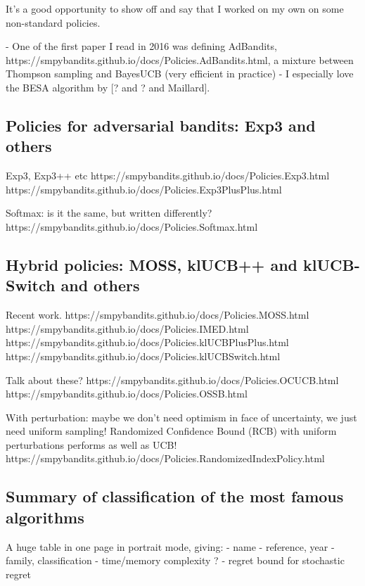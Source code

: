 It's a good opportunity to show off and say that I worked on my own on some non-standard policies.

- One of the first paper I read in 2016 was defining AdBandits, https://smpybandits.github.io/docs/Policies.AdBandits.html, a mixture between Thompson sampling and BayesUCB (very efficient in practice)
- I especially love the BESA algorithm by [? and ? and Maillard].


\subsection{Policies for adversarial bandits: Exp3 and others}

Exp3, Exp3++ etc
https://smpybandits.github.io/docs/Policies.Exp3.html
https://smpybandits.github.io/docs/Policies.Exp3PlusPlus.html

Softmax: is it the same, but written differently?
https://smpybandits.github.io/docs/Policies.Softmax.html


\subsection{Hybrid policies: MOSS, klUCB++ and klUCB-Switch and others}

Recent work.
https://smpybandits.github.io/docs/Policies.MOSS.html
https://smpybandits.github.io/docs/Policies.IMED.html
https://smpybandits.github.io/docs/Policies.klUCBPlusPlus.html
https://smpybandits.github.io/docs/Policies.klUCBSwitch.html

Talk about these?
https://smpybandits.github.io/docs/Policies.OCUCB.html
https://smpybandits.github.io/docs/Policies.OSSB.html

With perturbation: maybe we don't need optimism in face of uncertainty, we just need uniform sampling!
Randomized Confidence Bound (RCB) with uniform perturbations performs as well as UCB!
https://smpybandits.github.io/docs/Policies.RandomizedIndexPolicy.html


\subsection{Summary of classification of the most famous algorithms}

A huge table in one page in portrait mode, giving:
- name
- reference, year
- family, classification
- time/memory complexity ?
- regret bound for stochastic regret

